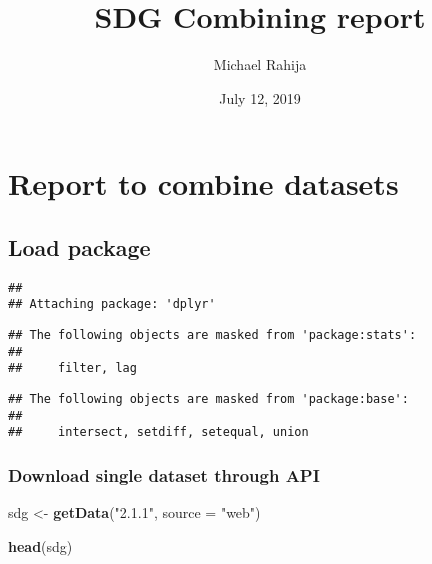 \documentclass[]{article}
\title{SDG Combining report}
\author{Michael Rahija}
\date{July 12, 2019}
\newenvironment{Shaded}{\begin{snugshade}}{\end{snugshade}}
\newcommand{\KeywordTok}[1]{\textcolor[rgb]{0.13,0.29,0.53}{\textbf{#1}}}
\newcommand{\DataTypeTok}[1]{\textcolor[rgb]{0.13,0.29,0.53}{#1}}
\newcommand{\StringTok}[1]{\textcolor[rgb]{0.31,0.60,0.02}{#1}}
\newcommand{\CommentTok}[1]{\textcolor[rgb]{0.56,0.35,0.01}{\textit{#1}}}
\newcommand{\OperatorTok}[1]{\textcolor[rgb]{0.81,0.36,0.00}{\textbf{#1}}}
\newcommand{\NormalTok}[1]{#1}
\begin{document}
\maketitle

\section{Report to combine datasets}\label{report-to-combine-datasets}

\subsection{Load package}\label{load-package}

\begin{Shaded}
\end{Shaded}

\begin{verbatim}
## 
## Attaching package: 'dplyr'
\end{verbatim}

\begin{verbatim}
## The following objects are masked from 'package:stats':
## 
##     filter, lag
\end{verbatim}

\begin{verbatim}
## The following objects are masked from 'package:base':
## 
##     intersect, setdiff, setequal, union
\end{verbatim}

\subsubsection{Download single dataset through
API}\label{download-single-dataset-through-api}

\begin{Shaded}
\begin{Highlighting}[]
\NormalTok{sdg <-}\StringTok{ }\KeywordTok{getData}\NormalTok{(}\StringTok{"2.1.1"}\NormalTok{, }
               \DataTypeTok{source =} \StringTok{"web"}\NormalTok{)}

\KeywordTok{head}\NormalTok{(sdg)}
\end{Highlighting}
\end{Shaded}
\end{document}
